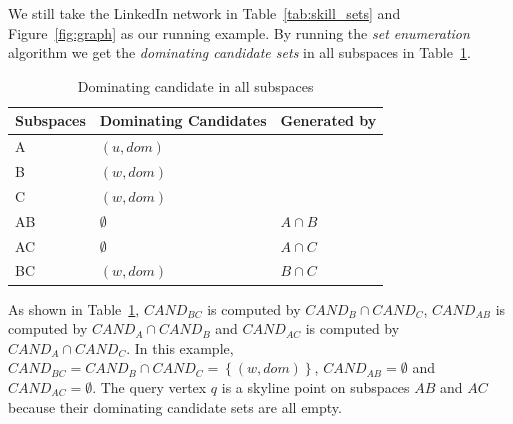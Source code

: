 We still take the LinkedIn network in Table~\ref{tab:skill_sets} and Figure~\ref{fig:graph} as our running example. By running the \emph{set enumeration} algorithm we get the \emph{dominating candidate sets} in all subspaces in Table~\ref{tab:sub_dom_cand_pruned}.

\begin{table}[H]
    \centering
    \begin{tabular}{|l|l|l|}
    \hline
    Subspaces & Dominating Candidates & Generated by \\ \hline
    A         & $(u, dom)$  &              \\ \hline
    B         & $(w, dom)$  &              \\ \hline
    C         & $(w, dom)$  &              \\ \hline
    AB        & $\emptyset$           & $A \cap B$   \\ \hline
    AC        & $\emptyset$           & $A \cap C$   \\ \hline
    BC        & $(w, dom)$            & $B \cap C$   \\ \hline
    \end{tabular}
    \caption{Dominating candidate in all subspaces}
    \label{tab:sub_dom_cand_pruned}
\end{table}

As shown in Table~\ref{tab:sub_dom_cand_pruned}, $\mathit{CAND}_{BC}$ is computed by $\mathit{CAND}_{B} \cap \mathit{CAND}_{C}$, $\mathit{CAND}_{AB}$ is computed by $\mathit{CAND}_{A} \cap \mathit{CAND}_{B}$ and $\mathit{CAND}_{AC}$ is computed by $\mathit{CAND}_{A} \cap \mathit{CAND}_{C}$. In this example, $\mathit{CAND}_{BC} = \mathit{CAND}_B \cap \mathit{CAND}_C = \left\{(w, dom)\right\}$, $\mathit{CAND}_{AB} = \emptyset$ and $\mathit{CAND}_{AC} = \emptyset$.
The query vertex $q$ is a skyline point on subspaces $AB$ and $AC$ because their dominating candidate sets are all empty.
